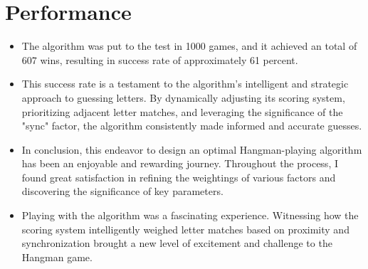 \documentclass[titlepage, 11pt]{article}
\begin{document}
\section{Performance}%
\label{sec:label}
\begin{itemize}
      \item The algorithm was put to the test in 1000 games, and it achieved an total of 607 wins, resulting in success rate of approximately 61 percent.
        \item This success rate is a testament to the algorithm's intelligent and strategic approach to guessing letters. By dynamically adjusting its scoring system, prioritizing adjacent letter matches, and leveraging the significance of the "sync" factor, the algorithm consistently made informed and accurate guesses.


\end{itemize}

\label{sec:label}
\begin{itemize}
\item In conclusion, this endeavor to design an optimal Hangman-playing algorithm has been an enjoyable and rewarding journey. Throughout the process, I found great satisfaction in refining the weightings of various factors and discovering the significance of key parameters.
        \item Playing with the algorithm was a fascinating experience. Witnessing how the scoring system intelligently weighed letter matches based on proximity and synchronization brought a new level of excitement and challenge to the Hangman game.

\end{itemize}



% 
% 
\end{document}
